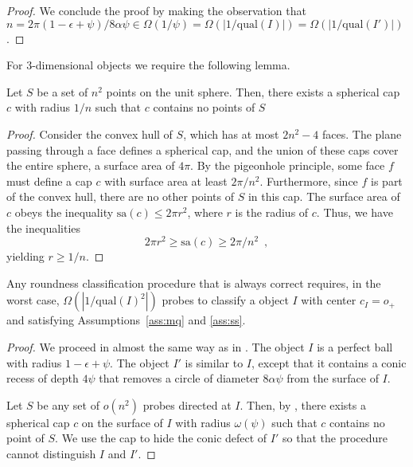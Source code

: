 \documentclass[11pt]{article}
\newcommand{\sa}{\mathrm{sa}}
\newcommand{\origin}{o_+}
\newcommand{\qual}{\mathrm{qual}}
\begin{document}
\begin{proof}
We conclude the proof by making the observation that
$n=2\pi(1-\epsilon+\psi)/8\alpha\psi\in
\Omega(1/\psi)=\Omega(|1/\qual(I)|)=\Omega(|1/\qual(I')|)$. 
\end{proof}

For 3-dimensional objects we require the following lemma.

\begin{lem}
Let $S$ be a set of $n^2$ points on the unit sphere.  Then, there
exists a spherical cap $c$ with radius $1/n$ such that $c$ contains no
points of $S$
\end{lem}

\begin{proof}
Consider the convex hull of $S$, which has at most $2n^2-4$ faces.
The plane passing through a face defines a spherical cap, and the
union of these caps cover the entire sphere, a surface area of $4\pi$.
By the pigeonhole principle, some face $f$ must define a cap $c$ with
surface area at least $2\pi/n^2$.  Furthermore, since $f$ is part of
the convex hull, there are no other points of $S$ in this cap.  The
surface area of $c$ obeys the inequality $\sa(c) \le 2\pi r^2$, where
$r$ is the radius of $c$. Thus, we have the inequalities
\[ 2\pi r^2  \ge \sa(c) \ge 2\pi/n^2 \enspace , \]
yielding $r\ge 1/n$.
\end{proof}

\begin{thm}
Any roundness classification procedure that is always correct
requires, in the worst case, $\Omega(|1/\qual(I)^2|)$ probes to
classify a object $I$ with center $c_I=\origin$ and satisfying
Assumptions~\ref{ass:mq} and \ref{ass:ss}.
\end{thm}

\begin{proof}
We proceed in almost the same way as in .
The object $I$ is a perfect ball with radius $1-\epsilon+\psi$.  The
object $I'$ is similar to $I$, except that it contains a conic recess
of depth $4\psi$ that removes a circle of diameter $8\alpha\psi$ from
the surface of $I$.

Let $S$ be any set of $o(n^2)$ probes directed at $I$.  Then, by
, there exists a spherical cap $c$ on the surface
of $I$ with radius $\omega(\psi)$ such that $c$ contains no point of
$S$.  We use the cap to hide the conic defect of $I'$ so that the
procedure cannot distinguish $I$ and $I'$.
\end{proof}
\end{document}
